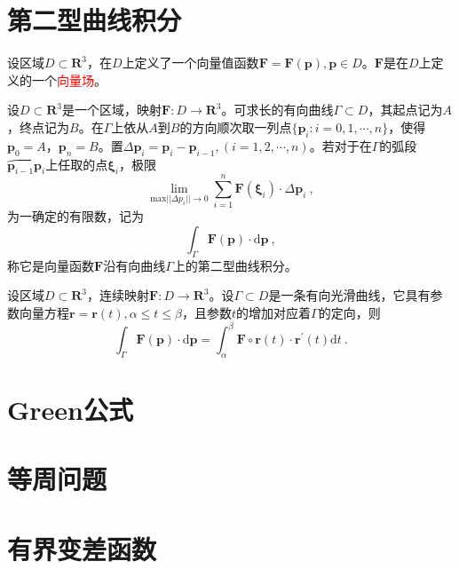 \documentclass[12pt,a4paper]{article}
\renewcommand{\vec}[1]{\boldsymbol{#1}}
\newcommand{\dif}{\mathrm{d}}
\begin{document}
\section{第二型曲线积分}
设区域$D \subset \mathbf R^3$，在$D$上定义了一个向量值函数$\vec{F} = \vec{F}(\vec{p}), \vec{p} \in D$。$\vec{F}$是在$D$上定义的一个\textcolor{red}{向量场}。


\begin{tcolorbox}[colback=green!5,colframe=green!40!black,title= 定义]
设$D \subset \mathbf R^3$是一个区域，映射$\vec{F}: D \rightarrow \mathbf R^3$。可求长的有向曲线$\Gamma \subset D$，其起点记为$A$，终点记为$B$。在$\Gamma$上依从$A$到$B$的方向顺次取一列点$\{\vec{p}_i : i = 0, 1, \cdots, n \}$，使得$\vec{p}_0 = A$，$\vec{p}_n = B$。置$\Delta \vec{p}_i = \vec{p}_i -\vec{p}_{i-1}, (i = 1, 2, \cdots, n)$。若对于在$\Gamma$的弧段$\wideparen{\vec{p}_{i-1}\vec{p}_i}$上任取的点$\vec{\xi}_i$，极限
\begin{equation}
\underset{\text{max} ||\Delta p_i || \rightarrow 0}\lim \sum_{i=1}^n \vec{F}(\vec{\xi}_i) \cdot \Delta \vec{p}_i ~,
\end{equation}
为一确定的有限数，记为
\begin{equation*}
\int_\Gamma \vec{F}(\vec{p})\cdot \dif \vec{p} ~,
\end{equation*}
称它是向量函数$\vec{F}$沿有向曲线$\Gamma$上的第二型曲线积分。
\end{tcolorbox}


\begin{tcolorbox}[colback=green!5,colframe=green!40!black,title= 定理]
设区域$D \subset \mathbf R^3$，连续映射$\vec{F}: D \rightarrow \mathbf R^3$。设$\Gamma \subset D$是一条有向光滑曲线，它具有参数向量方程$\vec{r} = \vec{r}(t), \alpha \leqslant t \leqslant \beta$，且参数$t$的增加对应着$\Gamma$的定向，则
\begin{equation*}
\int_\Gamma \vec{F}(\vec{p})\cdot \dif \vec{p} = \int_\alpha^\beta \vec{F}\circ \vec{r}(t) \cdot \vec{r}^\prime(t) \dif t ~.
\end{equation*}
\end{tcolorbox}









\section{Green公式}



\section{等周问题}



\section{有界变差函数}
\end{document}
